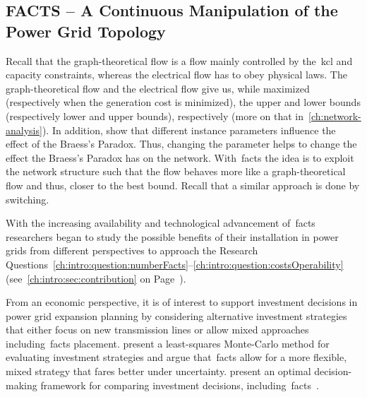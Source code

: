 \subsection{FACTS -- A Continuous Manipulation of the Power Grid Topology}
\label{ch:related-work:sec:facts}
% 
Recall that the graph-theoretical flow is a flow mainly controlled by
the~\gls{kcl} and capacity constraints, whereas the electrical flow has to obey
physical laws. The graph-theoretical flow and the electrical flow give us, while
maximized (respectively when the generation cost is minimized), the upper and
lower bounds (respectively lower and upper bounds), respectively (more on that
in~\cref{ch:network-analysis}). In addition, \textcite{Pas97} show that
different instance parameters influence the effect of the Braess's Paradox.
Thus, changing the parameter helps to change the effect the Braess's Paradox has
on the network. With~\gls{facts} the idea is to exploit the network structure
such that the flow behaves more like a graph-theoretical flow and thus, closer
to the best bound. Recall that a similar approach is done by switching.

With the increasing availability and technological advancement of~\gls{facts}
researchers began to study the possible benefits of their installation in power
grids from different perspectives to approach the Research
Questions~\ref{ch:intro:question:numberFacts}--\ref{ch:intro:question:costsOperability}
(see~\cref{ch:intro:sec:contribution} on
Page~\pageref{ch:intro:facts:researchQuestion}).

From an economic perspective, it is of interest to support investment decisions
in power grid expansion planning by considering alternative investment
strategies that either focus on new transmission lines or allow mixed approaches
including~\gls{facts} placement. \textcite{bogr-rovfi-11} present a
least-squares Monte-Carlo method for evaluating investment strategies and argue
that~\gls{facts} allow for a more flexible, mixed strategy that fares
better under uncertainty. \citeauthor{ti-oidte-12} present an optimal
decision-making framework for comparing investment decisions,
including~\gls{facts}~\parencite{ti-oidte-12}.

